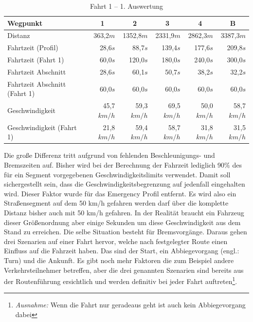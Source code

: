 \begin{table}[htb]
\centering
\small
\caption{Fahrt 1 -- 1. Auswertung}
\label{tab:driveinit}
\begin{tabular}{|l|r|r|r|r|r|}
\hline
Wegpunkt                               & \multicolumn{1}{c|}{1} & \multicolumn{1}{c|}{2} & \multicolumn{1}{c|}{3} & \multicolumn{1}{c|}{4} & \multicolumn{1}{c|}{B}      \\ \hline
Distanz                                & 363,2$m$                & 1352,8$m$               & 2331,9$m$               & 2862,3$m$               & 3387,3$m$               \\ \hline
Fahrtzeit (Profil)                     & 28,6$s$                 & 88,7$s$                 & 139,4$s$                & 177,6$s$                & 209,8$s$                \\ \hline
Fahrtzeit (Fahrt 1)                  & 60,0$s$                 & 120,0$s$                & 180,0$s$                & 240,0$s$                & 300,0$s$                \\ \hline
Fahrtzeit Abschnitt                    & 28,6$s$                 & 60,1$s$                 & 50,7$s$                 & 38,2$s$                 & 32,2$s$                 \\ \hline
Fahrtzeit Abschnitt (Fahrt 1)        & 60,0$s$                 & 60,0$s$                 & 60,0$s$                 & 60,0$s$                 & 60,0$s$                 \\ \hline
Geschwindigkeit                        & 45,7$km/h$              & 59,3$km/h$              & 69,5$km/h$              & 50,0$km/h$              & 58,7$km/h$              \\ \hline
Geschwindigkeit (Fahrt 1)            & 21,8$km/h$              & 59,4$km/h$              & 58,7$km/h$              & 31,8$km/h$              & 31,5$km/h$              \\ \hline
\end{tabular}
\end{table}

Die große Differenz tritt aufgrund von fehlenden Beschleunigungs- und Bremszeiten auf.
Bisher wird bei der Berechnung der Fahrzeit lediglich 90$\%$ des für ein Segment vorgegebenen Geschwindigkeitslimits verwendet.
Damit soll sichergestellt sein, dass die Geschwindigkeitsbegrenzung auf jedenfall eingehalten wird.
Dieser Faktor wurde für das Emergency Profil entfernt.
Es wird also ein Straßensegment auf dem 50 km/h gefahren werden darf über die komplette Distanz bisher auch mit 50 km/h gefahren.
In der Realität braucht ein Fahrzeug dieser Größenordnung aber einige Sekunden um diese Geschwindigkeit aus dem Stand zu erreichen.
Die selbe Situation besteht für Bremsvorgänge.
Daraus gehen drei Szenarien auf einer Fahrt hervor, welche nach festgelegter Route einen Einfluss auf die Fahrzeit haben.
Das sind der Start, ein Abbiegevorgang (engl.: Turn) und die Ankunft.
Es gibt noch mehr Faktoren die zum Beispiel andere Verkehrsteilnehmer betreffen, aber die drei genannten Szenarien sind bereits aus der Routenführung ersichtlich und werden definitiv bei jeder Fahrt auftreten\footnote{\textit{Ausnahme:} Wenn die Fahrt nur geradeaus geht ist auch kein Abbiegevorgang dabei}.

